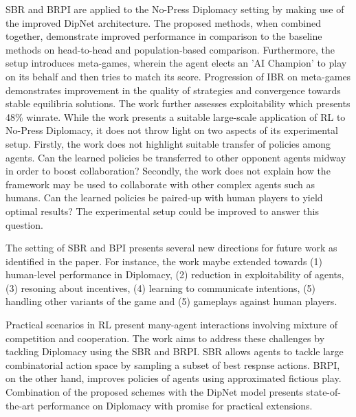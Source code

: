 \documentclass[11pt,letterpaper]{article}
\begin{document}
SBR and BRPI are applied to the No-Press Diplomacy setting by making use of the improved DipNet architecture. The proposed methods, when combined together, demonstrate improved performance in comparison to the baseline methods on head-to-head and population-based comparison. Furthermore, the setup introduces meta-games, wherein the agent elects an 'AI Champion' to play on its behalf and then tries to match its score. Progression of IBR on meta-games demonstrates improvement in the quality of strategies and convergence towards stable equilibria solutions. The work further assesses exploitability which presents 48\% winrate. While the work presents a suitable large-scale application of RL to No-Press Diplomacy, it does not throw light on two aspects of its experimental setup. Firstly, the work does not highlight suitable transfer of policies among agents. Can the learned policies be transferred to other opponent agents midway in order to boost collaboration? Secondly, the work does not explain how the framework may be used to collaborate with other complex agents such as humans. Can the learned policies be paired-up with human players to yield optimal results? The experimental setup could be improved to answer this question.

The setting of SBR and BPI presents several new directions for future work as identified in the paper. For instance, the work maybe extended towards (1) human-level performance in Diplomacy, (2) reduction in exploitability of agents, (3) resoning about incentives, (4) learning to communicate intentions, (5) handling other variants of the game and (5) gameplays against human players. 

Practical scenarios in RL present many-agent interactions involving mixture of competition and cooperation. The work aims to address these challenges by tackling Diplomacy using the SBR and BRPI. SBR allows agents to tackle large combinatorial action space by sampling a subset of best respnse actions. BRPI, on the other hand, improves policies of agents using approximated fictious play. Combination of the proposed schemes with the DipNet model presents state-of-the-art performance on Diplomacy with promise for practical extensions. 
\end{document}
